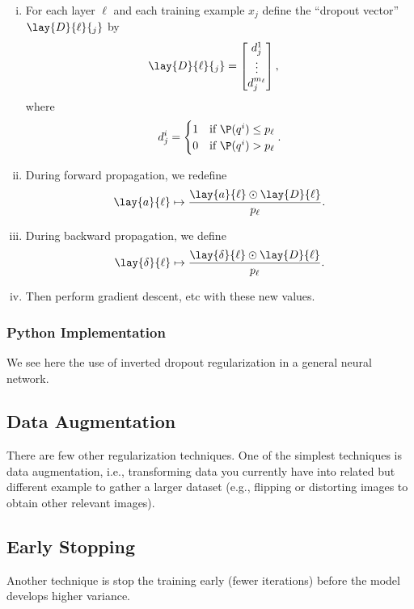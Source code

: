 \begin{enumerate}[i.]
	\item For each layer $\ell$ and each training example $x_j$ define the ``dropout vector'' $\lay{D}{\ell}{_j}$ by
	\begin{align*}
		\lay{D}{\ell}{_j}&=\begin{bmatrix}
			d^1_j\\
			\vdots\\
			d^{m_\ell}_j
		\end{bmatrix},
	\end{align*}
	where
	$$d^i_j=\begin{cases}
		1&\text{if }\P(q^i)\leq p_\ell\\
		0&\text{if }\P(q^i)>p_\ell
	\end{cases}.$$
	\item During forward propagation, we redefine
	$$\lay{a}{\ell}\mapsto \frac{\lay{a}{\ell}\odot \lay{D}{\ell}}{p_\ell}.$$
	\item During backward propagation, we define
	$$\lay{\delta}{\ell}\mapsto \frac{\lay{\delta}{\ell}\odot\lay{D}{\ell}}{p_\ell}.$$
	\item Then perform gradient descent, etc with these new values.
\end{enumerate}

\subsubsection{Python Implementation}
We see here the use of inverted dropout regularization in a general neural network.





\subsection{Data Augmentation}

There are few other regularization techniques.  One of the simplest techniques is data augmentation, i.e., transforming data you currently have into related but different example to gather a larger dataset (e.g., flipping or distorting images to obtain other relevant images).

\subsection{Early Stopping}
Another technique is stop the training early (fewer iterations) before the model develops higher variance.

